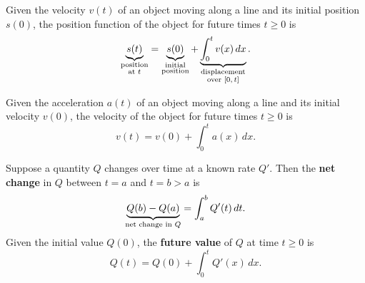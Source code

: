 \documentclass[../mathNotesPreamble]{subfiles}
\begin{document}
  \begin{center}
  \end{center}

  \begin{thmBox*}
    Given the velocity $v(t)$ of an object moving along a line and its initial position $s(0)$, the position function of the object for future times $t\geq 0$ is
      \[\underbrace{s(t)}_{\substack{\textnormal{position}\\ \textnormal{at $t$}}}=\underbrace{s(0)}_{\substack{\textnormal{initial}\\\textnormal{position}}}+\underbrace{\int_0^t v(x)\,dx}_{\substack{\textnormal{displacement}\\\textnormal{over ${\left[0,t\right]}$}}}.\]
  \end{thmBox*}
  \pagebreak

  \begin{thmBox*}
    Given the acceleration $a(t)$ of an object moving along a line and its initial velocity $v(0)$, the velocity of the object for future times $t\geq 0$ is
      \[v(t)=v(0)+\int_0^t a(x)\,dx.\]
  \end{thmBox*}

  \begin{thmBox*}
    Suppose a quantity $Q$ changes over time at a known rate $Q'$. Then the \textbf{net change} in $Q$ between $t=a$ and $t=b>a$ is
      \[\underbrace{Q(b)-Q(a)}_{\textnormal{net change in }Q}=\int_a^b Q'(t)\,dt.\]
    Given the initial value $Q(0)$, the \textbf{future value} of $Q$ at time $t\geq 0$ is
      \[Q(t)=Q(0)+\int_0^t Q'(x)\,dx.\]
  \end{thmBox*}
\end{document}
